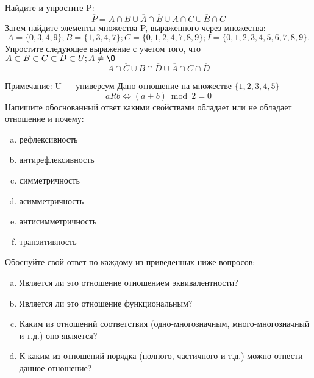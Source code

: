 \documentclass[10pt]{exam}
\begin{document}
\begin{questions}
\question
Найдите и упростите P:
\begin{equation*}
\overline{P} = A \cap B \cup \overline{A} \cap \overline{B} \cup A \cap C \cup \overline{B} \cap C
\end{equation*}
Затем найдите элементы множества P, выраженного через множества:
\begin{equation*}
A = \{0, 3, 4, 9\}; 
B = \{1, 3, 4, 7\};
C = \{0, 1, 2, 4, 7, 8, 9\};
I = \{0, 1, 2, 3, 4, 5, 6, 7, 8, 9\}.
\end{equation*}\question
Упростите следующее выражение с учетом того, что $A\subset B \subset C \subset D \subset U; A \neq \O$
\begin{equation*}
A \cap  \overline{C} \cup B \cap \overline{D} \cup  \overline{A} \cap C \cap  \overline{D}
\end{equation*}

Примечание: U — универсум\question
Дано отношение на множестве $\{1, 2, 3, 4, 5\}$ 
\begin{equation*}
aRb \iff (a+b) \bmod 2 =0
\end{equation*}
Напишите обоснованный ответ какими свойствами обладает или не обладает отношение и почему:   
\begin{enumerate} [a)]\setcounter{enumi}{0}
\item рефлексивность
\item антирефлексивность
\item симметричность
\item асимметричность
\item антисимметричность
\item транзитивность
\end{enumerate}

Обоснуйте свой ответ по каждому из приведенных ниже вопросов:
\begin{enumerate} [a)]\setcounter{enumi}{0}
    \item Является ли это отношение отношением эквивалентности?
    \item Является ли это отношение функциональным?
    \item Каким из отношений соответствия (одно-многозначным, много-многозначный и т.д.) оно является?
    \item К каким из отношений порядка (полного, частичного и т.д.) можно отнести данное отношение?
\end{enumerate}




\end{questions}
\end{document}
